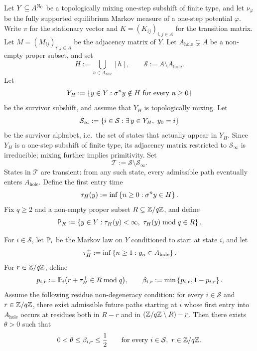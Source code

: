 \begin{theorem}
\label{thm:first-entry-escape-rate}
Let \(Y\subseteq A^{\mathbb{N}_0}\) be a topologically mixing one-step
subshift of finite type, and let \(\nu_\varphi\) be the fully supported
equilibrium Markov measure of a one-step potential \(\varphi\).  Write
\(\pi\) for the stationary vector and \(K=(K_{ij})_{i,j\in A}\) for the
transition matrix.  Let \(M=(M_{ij})_{i,j\in A}\) be the adjacency
matrix of \(Y\).  Let \(A_{\mathrm{hole}}\subsetneq A\) be a non-empty proper
subset, and set
\[
  H:=\bigcup_{h\in A_{\mathrm{hole}}}[h],
  \qquad
  \mathcal S:=A\setminus A_{\mathrm{hole}}.
\]
Let
\[
  Y_H:=\left\{y\in Y:\sigma^n y\notin H\text{ for every }n\geq 0\right\}
\]
be the survivor subshift, and assume that \(Y_H\) is topologically
mixing.  Let
\[
  \mathcal S_\infty
  := \left\{i\in\mathcal S:\exists\,y\in Y_H,\ y_0=i\right\}
\]
be the survivor alphabet, i.e.\ the set of states that actually appear
in \(Y_H\).  Since \(Y_H\) is a one-step subshift of finite type, its
adjacency matrix restricted to \(\mathcal S_\infty\) is irreducible;
mixing further implies primitivity.  Set
\[
  \mathcal T:=\mathcal S\setminus\mathcal S_\infty.
\]
States in \(\mathcal T\) are transient: from any such state, every
admissible path eventually enters \(A_{\mathrm{hole}}\).
Define the first entry time
\[
  \tau_H(y):=\inf\left\{n\geq 0:\sigma^n y\in H\right\}.
\]
Fix \(q\geq 2\) and a non-empty proper subset
\(R\subsetneq \mathbb{Z}/q\mathbb{Z}\), and define
\[
  \mathsf{P}_R
  := \left\{y\in Y:
      \tau_H(y)<\infty,\
      \tau_H(y)\bmod q\in R \right\}.
\]

For \(i\in\mathcal S\), let \(\mathbb{P}_i\) be the Markov law on \(Y\)
conditioned to start at state \(i\), and let
\[
  \tau_H^+
  := \inf\left\{n\geq 1:y_n\in A_{\mathrm{hole}}\right\}.
\]
For \(r\in\mathbb{Z}/q\mathbb{Z}\), define
\[
  p_{i,r}:=\mathbb{P}_i\bigl(r+\tau_H^+\in R \bmod q\bigr),
  \qquad
  \beta_{i,r}:=\min\left\{p_{i,r},1-p_{i,r}\right\}.
\]
Assume the following residue non-degeneracy condition:
for every \(i\in\mathcal S\) and \(r\in\mathbb{Z}/q\mathbb{Z}\), there exist
admissible future paths starting at \(i\) whose first entry into
\(A_{\mathrm{hole}}\) occurs at residues both in \(R-r\) and in
\((\mathbb{Z}/q\mathbb{Z}\setminus R)-r\).  Then there exists \(\theta>0\) such that
\[
  0<\theta\leq \beta_{i,r}\leq \frac12
  \qquad
  \text{for every } i\in\mathcal S,\ r\in\mathbb{Z}/q\mathbb{Z}.
\]


\end{theorem}
